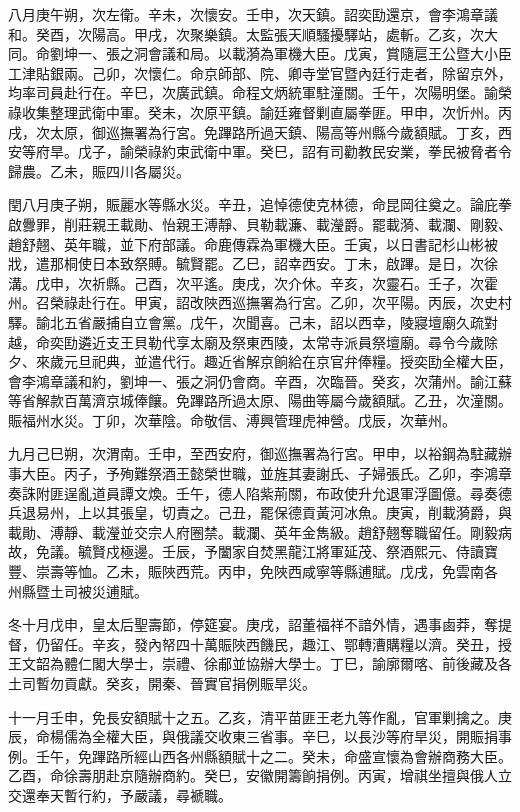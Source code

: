 \begin{pinyinscope}
八月庚午朔，次左衛。辛未，次懷安。壬申，次天鎮。詔奕劻還京，會李鴻章議和。癸酉，次陽高。甲戌，次聚樂鎮。太監張天順騷擾驛站，處斬。乙亥，次大同。命劉坤一、張之洞會議和局。以載漪為軍機大臣。戊寅，賞隨扈王公暨大小臣工津貼銀兩。己卯，次懷仁。命京師部、院、卿寺堂官暨內廷行走者，除留京外，均率司員赴行在。辛巳，次廣武鎮。命程文炳統軍駐潼關。壬午，次陽明堡。諭榮祿收集整理武衛中軍。癸未，次原平鎮。諭廷雍督剿直屬拳匪。甲申，次忻州。丙戌，次太原，御巡撫署為行宮。免蹕路所過天鎮、陽高等州縣今歲額賦。丁亥，西安等府旱。戊子，諭榮祿約束武衛中軍。癸巳，詔有司勸教民安業，拳民被脅者令歸農。乙未，賑四川各屬災。

閏八月庚子朔，賑麗水等縣水災。辛丑，追悼德使克林德，命昆岡往奠之。論庇拳啟釁罪，削莊親王載勛、怡親王溥靜、貝勒載濂、載瀅爵。罷載漪、載瀾、剛毅、趙舒翹、英年職，並下府部議。命鹿傳霖為軍機大臣。壬寅，以日書記杉山彬被戕，遣那桐使日本致祭賻。毓賢罷。乙巳，詔幸西安。丁未，啟蹕。是日，次徐溝。戊申，次祈縣。己酉，次平遙。庚戌，次介休。辛亥，次靈石。壬子，次霍州。召榮祿赴行在。甲寅，詔改陜西巡撫署為行宮。乙卯，次平陽。丙辰，次史村驛。諭北五省嚴捕自立會黨。戊午，次聞喜。己未，詔以西幸，陵寢壇廟久疏對越，命奕劻遴近支王貝勒代享太廟及祭東西陵，太常寺派員祭壇廟。尋令今歲除夕、來歲元旦祀典，並遣代行。趣近省解京餉給在京官弁俸糧。授奕劻全權大臣，會李鴻章議和約，劉坤一、張之洞仍會商。辛酉，次臨晉。癸亥，次蒲州。諭江蘇等省解款百萬濟京城俸饟。免蹕路所過太原、陽曲等屬今歲額賦。乙丑，次潼關。賑福州水災。丁卯，次華陰。命敬信、溥興管理虎神營。戊辰，次華州。

九月己巳朔，次渭南。壬申，至西安府，御巡撫署為行宮。甲申，以裕鋼為駐藏辦事大臣。丙子，予殉難祭酒王懿榮世職，並旌其妻謝氏、子婦張氏。乙卯，李鴻章奏誅附匪逞亂道員譚文煥。壬午，德人陷紫荊關，布政使升允退軍浮圖億。尋奏德兵退易州，上以其張皇，切責之。己丑，罷保德貢黃河冰魚。庚寅，削載漪爵，與載勛、溥靜、載瀅並交宗人府圈禁。載瀾、英年金雋級。趙舒翹奪職留任。剛毅病故，免議。毓賢戍極邊。壬辰，予闔家自焚黑龍江將軍延茂、祭酒熙元、侍讀寶豐、崇壽等恤。乙未，賑陜西荒。丙申，免陜西咸寧等縣逋賦。戊戌，免雲南各州縣暨土司被災逋賦。

冬十月戊申，皇太后聖壽節，停筵宴。庚戌，詔董福祥不諳外情，遇事鹵莽，奪提督，仍留任。辛亥，發內帑四十萬賑陜西饑民，趣江、鄂轉漕購糧以濟。癸丑，授王文韶為體仁閣大學士，崇禮、徐郙並協辦大學士。丁巳，諭廓爾喀、前後藏及各土司暫勿貢獻。癸亥，開秦、晉實官捐例賑旱災。

十一月壬申，免長安額賦十之五。乙亥，清平苗匪王老九等作亂，官軍剿擒之。庚辰，命楊儒為全權大臣，與俄議交收東三省事。辛巳，以長沙等府旱災，開賑捐事例。壬午，免蹕路所經山西各州縣額賦十之二。癸未，命盛宣懷為會辦商務大臣。乙酉，命徐壽朋赴京隨辦商約。癸巳，安徽開籌餉捐例。丙寅，增祺坐擅與俄人立交還奉天暫行約，予嚴議，尋褫職。


\end{pinyinscope}
